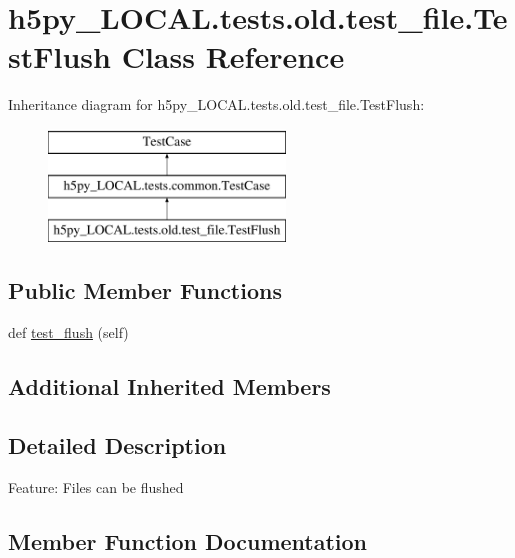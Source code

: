 \hypertarget{classh5py__LOCAL_1_1tests_1_1old_1_1test__file_1_1TestFlush}{}\section{h5py\+\_\+\+L\+O\+C\+A\+L.\+tests.\+old.\+test\+\_\+file.\+Test\+Flush Class Reference}
\label{classh5py__LOCAL_1_1tests_1_1old_1_1test__file_1_1TestFlush}
Inheritance diagram for h5py\+\_\+\+L\+O\+C\+A\+L.\+tests.\+old.\+test\+\_\+file.\+Test\+Flush\+:\begin{figure}[H]
\begin{center}
\leavevmode
\includegraphics[height=3.000000cm]{classh5py__LOCAL_1_1tests_1_1old_1_1test__file_1_1TestFlush}
\end{center}
\end{figure}
\subsection*{Public Member Functions}
\begin{DoxyCompactItemize}
\item 
def \hyperlink{classh5py__LOCAL_1_1tests_1_1old_1_1test__file_1_1TestFlush_a7e04fb613dd02cebc001f3c897121f7d}{test\+\_\+flush} (self)
\end{DoxyCompactItemize}
\subsection*{Additional Inherited Members}


\subsection{Detailed Description}
\begin{DoxyVerb}    Feature: Files can be flushed
\end{DoxyVerb}
 

\subsection{Member Function Documentation}
\mbox{\label{classh5py__LOCAL_1_1tests_1_1old_1_1test__file_1_1TestFlush_a7e04fb613dd02cebc001f3c897121f7d}} 
